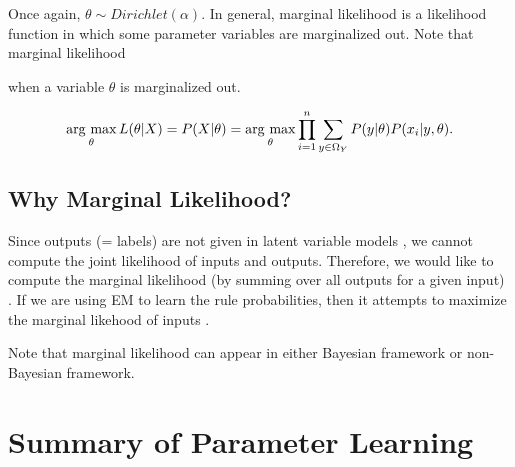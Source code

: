 \documentclass[11pt]{article}
\newcommand{\argmax}{\mathop{\rm arg~max}\limits}
\begin{document}
Once again, $\theta \sim Dirichlet(\alpha)$. 
In general, marginal likelihood is a likelihood function in which some parameter variables are marginalized out. Note that marginal likelihood


when a variable $\theta$ is marginalized out.

%
$$
\argmax_{\theta} L(\theta|X) = P(X|\theta) = \argmax_{\theta} \prod^n_{i = 1} \sum_{y \in \Omega_Y}P(y|\theta) P(x_i|y, \theta).
$$
%
%

\subsection{Why Marginal Likelihood?}
Since outputs (= labels) are not given in latent variable models \cite{liang_jordan_klein}, we cannot compute the joint likelihood of inputs and outputs. Therefore, we would like to compute the marginal likelihood (by summing over all outputs for a given input) \cite{pcfg_marginal}. If we are using EM to learn the rule probabilities, then it attempts to maximize the marginal likehood of inputs \cite{pcfg_marginal}.

Note that marginal likelihood can appear in either Bayesian framework or non-Bayesian framework.

\section{Summary of Parameter Learning \cite{mlss09}}
\end{document}
